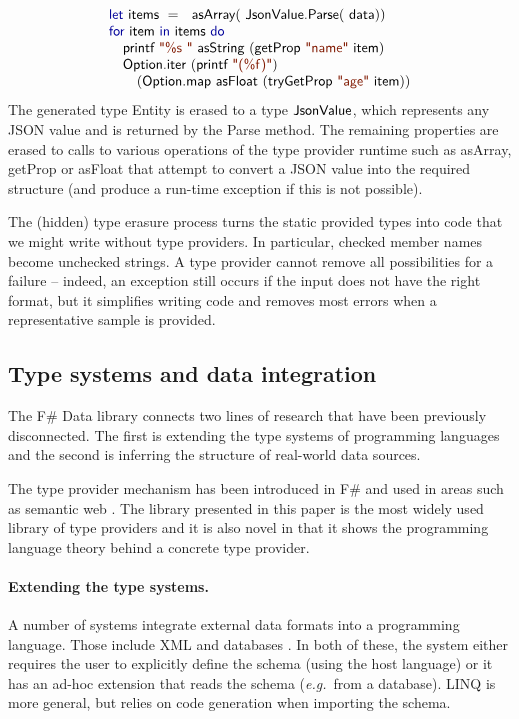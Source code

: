 \documentclass[preprint]{sigplanconf}
\newcommand{\kvd}[1]{\textnormal{\textcolor{kvdclr}{\sffamily #1}}}
\newcommand{\str}[1]{\textnormal{\textcolor{strclr}{\sffamily "#1"}}}
\newcommand{\ident}[1]{\textnormal{\sffamily #1}}
\begin{document}
\noindent
\begin{equation*}
\begin{array}{l}
 \kvd{let}~\ident{items}~=~\ident{asArray}(\ident{JsonValue.Parse}(\ident{data}))\\
 \kvd{for}~\ident{item}~\kvd{in}~\ident{items}~\kvd{do}\\
 \quad\ident{printf}~\str{\%s }~\ident{asString}~(\ident{getProp}~\str{name}~\ident{item})\\
 \quad\ident{Option.iter}~(\ident{printf}~\str{(\%f)})\\
 \qquad(\ident{Option.map}~\ident{asFloat}~(\ident{tryGetProp}~\str{age}~\ident{item}))
\end{array}
\end{equation*}
%
The generated type \ident{Entity} is erased to a type $\ident{JsonValue}$, which represents any
JSON value and is returned by the \ident{Parse} method. The remaining properties are erased to
calls to various operations of the type provider runtime such as \ident{asArray}, \ident{getProp}
or \ident{asFloat} that attempt to convert a JSON value into the required structure (and produce
a run-time exception if this is not possible).

The (hidden) type erasure process turns the static provided types into code that we might write
without type providers. In particular, checked member names become unchecked strings. A type
provider cannot remove all possibilities for a failure -- indeed, an exception still occurs if the
input does not have the right format, but it simplifies writing code and removes most errors when
a representative sample is provided.

\subsection{Type systems and data integration}
The F\# Data library connects two lines of research that have been previously disconnected. The
first is extending the type systems of programming languages and the second is inferring the
structure of real-world data sources.

The type provider mechanism has been introduced in F\# \cite{fsharp-typeprov,fsharp-typeprov-ddfp}
and used in areas such as semantic web \cite{liteq}. The library presented in this paper is the
most widely used library of type providers and it is also novel in that it shows the programming
language theory behind a concrete type provider.

\paragraph{Extending the type systems.}
A number of systems integrate external data formats into a programming language. Those include
XML \cite{xduce,xduce-ml} and databases \cite{links}. In both of these, the system either requires
the user to explicitly define the schema (using the host language) or it has an ad-hoc extension
that reads the schema (\emph{e.g.}~from a database). LINQ \cite{linq} is more general, but relies
on code generation when importing the schema.
\end{document}
